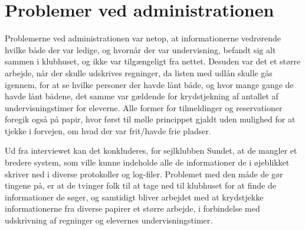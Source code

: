 \section*{Problemer ved administrationen}
Problemerne ved administrationen var netop, at informationerne vedrørende hvilke både der var ledige, og hvornår der var undervisning, befandt sig alt sammen i klubhuset, og ikke var tilgængeligt fra nettet. Desuden var det et større arbejde, når der skulle udskrives regninger, da listen med udlån skulle gås igennem, for at se hvilke personer der havde lånt både, og hvor mange gange de havde lånt bådene, det samme var gældende for krydstjekning af antallet af undervisningstimer for eleverne. Alle former for tilmeldinger og reservationer foregik også på papir, hvor først til mølle princippet gjaldt uden mulighed for at tjekke i forvejen, om hvad der var frit/havde frie pladser.

Ud fra interviewet kan det konkluderes, for sejlklubben Sundet, at de mangler et bredere system, som ville kunne indeholde alle de informationer de i øjeblikket skriver ned i diverse protokoller og log-filer. Problemet med den måde de gør tingene på, er at de tvinger folk til at tage ned til klubhuset for at finde de informationer de søger, og samtidigt bliver arbejdet med at krydstjekke informationerne fra diverse papirer et større arbejde, i forbindelse med udskrivning af regninger og elevernes undervisningstimer.  